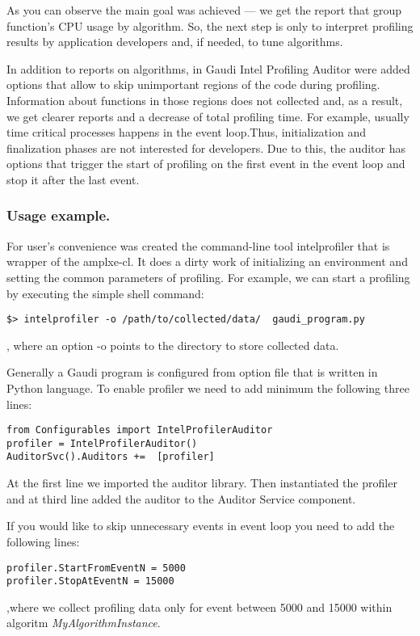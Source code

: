 \documentclass[a4paper]{jpconf}
\begin{document}
As you can observe the main goal was achieved --- we get the report that group function’s CPU usage by algorithm. 
So, the next step is only to interpret profiling results by application developers and, if needed, to tune algorithms.

In addition to reports on algorithms, in Gaudi Intel Profiling Auditor were added options that allow to skip 
unimportant regions of the code during profiling. Information about functions in those regions does not collected and, 
as a result, we get clearer reports and a decrease of total profiling time. For example, usually time critical 
processes happens in the event loop.Thus, initialization and finalization phases are not interested for developers. 
Due to this, the auditor has options that trigger the start of  profiling on the first event in the event loop 
and stop it after the last event. 

\subsubsection{Usage example.}

For user’s convenience was created the command-line tool intelprofiler that is wrapper of the amplxe-cl. 
It does a dirty work of initializing an environment and setting the common parameters of profiling. 
For example, we can start a profiling by executing the simple shell command:
\begin{verbatim}
$> intelprofiler -o /path/to/collected/data/  gaudi_program.py
\end{verbatim}
, where an option -o points to the directory to store collected data. 

Generally a Gaudi program is configured from option file that is written in Python language. 
To enable profiler we need to add minimum the following three lines:
\begin{verbatim}
from Configurables import IntelProfilerAuditor
profiler = IntelProfilerAuditor()
AuditorSvc().Auditors +=  [profiler]
\end{verbatim}

At the first line we imported the auditor library. Then instantiated the profiler and at third line added the auditor 
to the Auditor Service component.

If you would like to skip unnecessary events in event loop you need to add the following lines:
\begin{verbatim}
profiler.StartFromEventN = 5000 
profiler.StopAtEventN = 15000
\end{verbatim}
,where we collect profiling data only for event between 5000 and 15000 within algoritm {\it MyAlgorithmInstance}.
\end{document}
